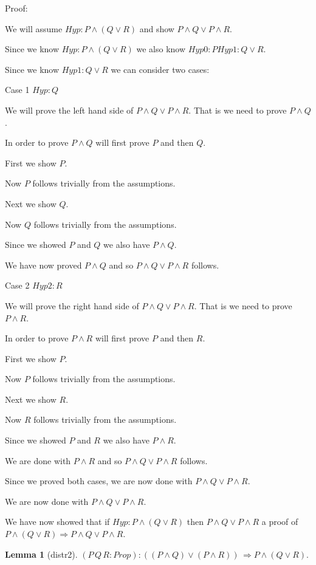 \documentclass[11pt, oneside]{article}
\newtheorem{Lemma}{Lemma}
\begin{document}
 Proof: \begin{subproof}We will assume $Hyp : P \land (Q \lor R) $ and show $P \land Q \lor P \land R $.\begin{subproof}Since we know $Hyp : P \land (Q \lor R) $ we also know $Hyp0 : P 
Hyp1 : Q \lor R $.\begin{subproof}Since we know $Hyp1 : Q \lor R $ we can consider two cases: 

 Case 1 $Hyp : Q $

 \begin{subproof}We will prove the left hand side of $P \land Q \lor P \land R $. That is we need to prove $P \land Q $.\begin{subproof}In order to prove $P \land Q $ will first prove $P $ and then $Q $.

 First we show $P $.\begin{subproof}Now $P $ follows trivially from the assumptions.\end{subproof} Next we show $Q $.\begin{subproof}Now $Q $ follows trivially from the assumptions.\end{subproof} Since we showed $P $ and $Q $ we also have $P \land Q $.\end{subproof} We have now proved $P \land Q $ and so $P \land Q \lor P \land R $ follows.\end{subproof} 

 Case 2 $Hyp2 : R $

 \begin{subproof}We will prove the right hand side of $P \land Q \lor P \land R $. That is we need to prove $P \land R $.\begin{subproof}In order to prove $P \land R $ will first prove $P $ and then $R $.

 First we show $P $.\begin{subproof}Now $P $ follows trivially from the assumptions.\end{subproof} Next we show $R $.\begin{subproof}Now $R $ follows trivially from the assumptions.\end{subproof} Since we showed $P $ and $R $ we also have $P \land R $.\end{subproof} We are done with $P \land R $ and so $P \land Q \lor P \land R $ follows.\end{subproof} Since we proved both cases, we are now done with $P \land Q \lor P \land R $.\end{subproof} We are now done with $P \land Q \lor P \land R $.\end{subproof} We have now showed that if $Hyp : P \land (Q \lor R) $ then $P \land Q \lor P \land R $ a proof of $P \land (Q \lor R) \Rightarrow P \land Q \lor P \land R $.\end{subproof}\begin{Lemma}[distr2] 
$(P\,Q\,R:Prop):((P\land Q)\lor (P\land R))\,\Rightarrow P\land (Q\lor R).$
 \end{Lemma}
\end{document}
